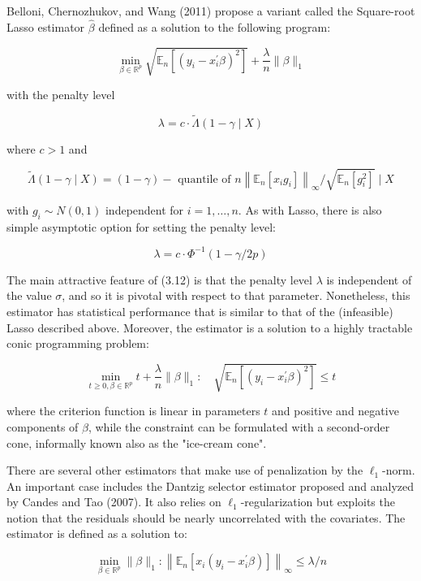 \documentclass[10pt]{article}
\begin{document}
Belloni, Chernozhukov, and Wang (2011) propose a variant called the Square-root Lasso estimator \(\widehat{\beta}\) defined as a solution to the following program:

\[
\min _{\beta \in \mathbb{R}^{p}} \sqrt{\mathbb{E}_{n}\left[\left(y_{i}-x_{i}^{\prime} \beta\right)^{2}\right]}+\frac{\lambda}{n}\|\beta\|_{1}
\]

with the penalty level

\[
\lambda=c \cdot \widetilde{\Lambda}(1-\gamma \mid X)
\]

where \(c>1\) and

\[
\widetilde{\Lambda}(1-\gamma \mid X)=(1-\gamma)-\text { quantile of } n\left\|\mathbb{E}_{n}\left[x_{i} g_{i}\right]\right\|_{\infty} / \sqrt{\mathbb{E}_{n}\left[g_{i}^{2}\right]} \mid X
\]

with \(g_{i} \sim N(0,1)\) independent for \(i=1, \ldots, n\). As with Lasso, there is also simple asymptotic option for setting the penalty level:

\[
\lambda=c \cdot \Phi^{-1}(1-\gamma / 2 p)
\]

The main attractive feature of (3.12) is that the penalty level \(\lambda\) is independent of the value \(\sigma\), and so it is pivotal with respect to that parameter. Nonetheless, this estimator has statistical performance that is similar to that of the (infeasible) Lasso described above. Moreover, the estimator is a solution to a highly tractable conic programming problem:

\[
\min _{t \geqslant 0, \beta \in \mathbb{R}^{p}} t+\frac{\lambda}{n}\|\beta\|_{1}: \quad \sqrt{\mathbb{E}_{n}\left[\left(y_{i}-x_{i}^{\prime} \beta\right)^{2}\right]} \leqslant t
\]

where the criterion function is linear in parameters \(t\) and positive and negative components of \(\beta\), while the constraint can be formulated with a second-order cone, informally known also as the "ice-cream cone".

There are several other estimators that make use of penalization by the \(\ell_{1}\)-norm. An important case includes the Dantzig selector estimator proposed and analyzed by Candes and Tao (2007). It also relies on \(\ell_{1}\)-regularization but exploits the notion that the residuals should be nearly uncorrelated with the covariates. The estimator is defined as a solution to:

\[
\min _{\beta \in \mathbb{R}^{p}}\|\beta\|_{1}:\left\|\mathbb{E}_{n}\left[x_{i}\left(y_{i}-x_{i}^{\prime} \beta\right)\right]\right\|_{\infty} \leqslant \lambda / n
\]
\end{document}
